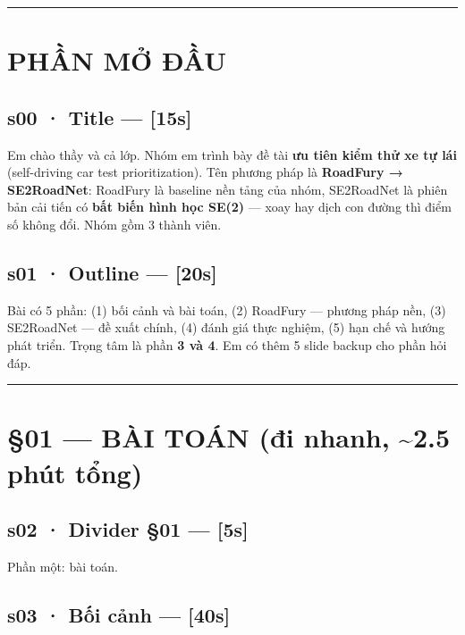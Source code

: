 \documentclass[
  11pt,
]{article}
\begin{document}
\begin{center}\rule{0.5\linewidth}{0.5pt}\end{center}

\section{PHẦN MỞ ĐẦU}\label{phux1ea7n-mux1edf-ux111ux1ea7u}

\subsection{s00 · Title --- {[}15s{]}}\label{s00-title-15s}

Em chào thầy và cả lớp. Nhóm em trình bày đề tài \textbf{ưu tiên kiểm
thử xe tự lái} (self-driving car test prioritization). Tên phương pháp
là \textbf{RoadFury → SE2RoadNet}: RoadFury là baseline nền tảng của
nhóm, SE2RoadNet là phiên bản cải tiến có \textbf{bất biến hình học
SE(2)} --- xoay hay dịch con đường thì điểm số không đổi. Nhóm gồm 3
thành viên.

\subsection{s01 · Outline --- {[}20s{]}}\label{s01-outline-20s}

Bài có 5 phần: (1) bối cảnh và bài toán, (2) RoadFury --- phương pháp
nền, (3) SE2RoadNet --- đề xuất chính, (4) đánh giá thực nghiệm, (5) hạn
chế và hướng phát triển. Trọng tâm là phần \textbf{3 và 4}. Em có thêm 5
slide backup cho phần hỏi đáp.

\begin{center}\rule{0.5\linewidth}{0.5pt}\end{center}

\section{§01 --- BÀI TOÁN (đi nhanh, \textasciitilde2.5 phút
tổng)}\label{buxe0i-touxe1n-ux111i-nhanh-2.5-phuxfat-tux1ed5ng}

\subsection{s02 · Divider §01 --- {[}5s{]}}\label{s02-divider-01-5s}

Phần một: bài toán.

\subsection{s03 · Bối cảnh ---
{[}40s{]}}\label{s03-bux1ed1i-cux1ea3nh-40s}
\end{document}
